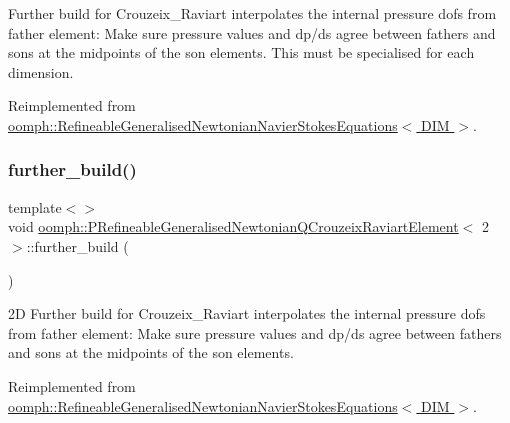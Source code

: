 Further build for Crouzeix\+\_\+\+Raviart interpolates the internal pressure dofs from father element\+: Make sure pressure values and dp/ds agree between fathers and sons at the midpoints of the son elements. This must be specialised for each dimension. 

Reimplemented from \hyperlink{classoomph_1_1RefineableGeneralisedNewtonianNavierStokesEquations_a53a4c5277d517f5df48df7c1953b2b02}{oomph\+::\+Refineable\+Generalised\+Newtonian\+Navier\+Stokes\+Equations$<$ D\+I\+M $>$}.

\mbox{\label{classoomph_1_1PRefineableGeneralisedNewtonianQCrouzeixRaviartElement_a081745337b1a25f560af7199dfa75ce3}} 
\subsubsection{\texorpdfstring{further\+\_\+build()}{further\_build()}\hspace{0.1cm}{\footnotesize\ttfamily [2/3]}}
{\footnotesize\ttfamily template$<$$>$ \\
void \hyperlink{classoomph_1_1PRefineableGeneralisedNewtonianQCrouzeixRaviartElement}{oomph\+::\+P\+Refineable\+Generalised\+Newtonian\+Q\+Crouzeix\+Raviart\+Element}$<$ 2 $>$\+::further\+\_\+build (\begin{DoxyParamCaption}{ }\end{DoxyParamCaption})\hspace{0.3cm}{\ttfamily [virtual]}}

2D Further build for Crouzeix\+\_\+\+Raviart interpolates the internal pressure dofs from father element\+: Make sure pressure values and dp/ds agree between fathers and sons at the midpoints of the son elements. 

Reimplemented from \hyperlink{classoomph_1_1RefineableGeneralisedNewtonianNavierStokesEquations_a53a4c5277d517f5df48df7c1953b2b02}{oomph\+::\+Refineable\+Generalised\+Newtonian\+Navier\+Stokes\+Equations$<$ D\+I\+M $>$}.



